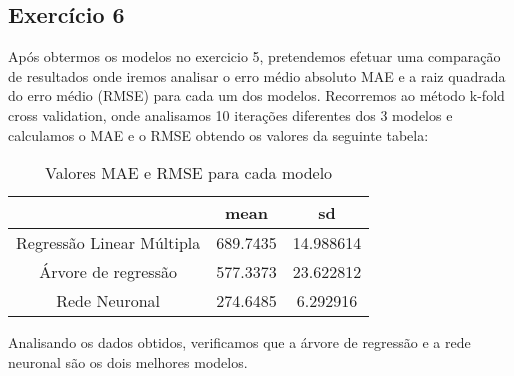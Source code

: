 \subsection{Exercício 6}
Após obtermos os modelos no exercicio 5, pretendemos efetuar uma comparação de resultados onde iremos analisar o erro médio absoluto MAE e a raiz quadrada do erro médio (RMSE) para cada um dos modelos. 
Recorremos ao método k-fold cross validation, onde analisamos 10 iterações diferentes dos 3 modelos e calculamos o MAE e o RMSE obtendo os valores da seguinte tabela:

\begin{table}[htbp]
	\caption{Valores MAE e RMSE para cada modelo}
    \begin{center}
    \begin{tabular}{|c|c|c|}
    \hline
        & \textbf{mean} & \textbf{sd}\\
    \hline
        Regressão Linear Múltipla & 689.7435 & 14.988614\\
    \hline
        Árvore de regressão & 577.3373 & 23.622812\\
    \hline
        Rede Neuronal & 274.6485 & 6.292916\\
    \hline
    \end{tabular}
    \label{tab_6}
    \end{center}
\end{table}

Analisando os dados obtidos, verificamos que a árvore de regressão e a rede neuronal são os dois melhores modelos.